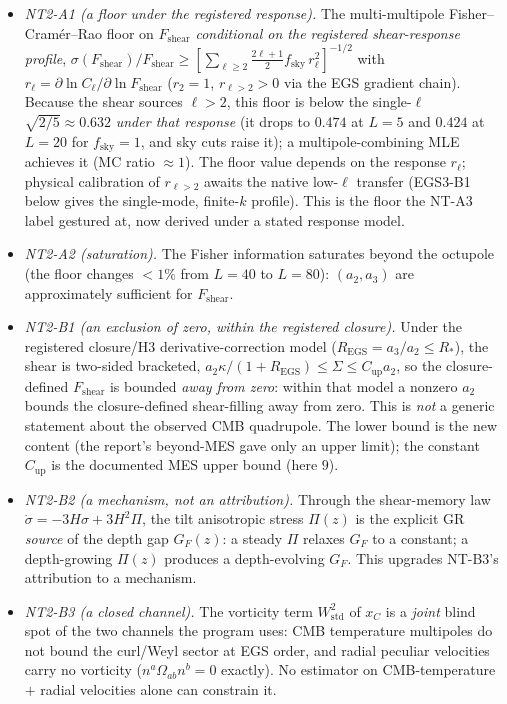 \documentclass[11pt,a4paper]{article}
\newcommand{\xC}{x_{C}}
\newcommand{\Wstd}{W^{2}_{\mathrm{std}}}
\newcommand{\Fshear}{F_{\mathrm{shear}}}
\newcommand{\GF}{G_{F}}
\theoremstyle{plain}
\theoremstyle{definition}
\begin{document}
\begin{itemize}[leftmargin=1.4em,itemsep=3pt]
  \item \emph{NT2-A1 (a floor under the registered response).} The
        multi-multipole Fisher--Cram\'er--Rao floor on $\Fshear$
        \emph{conditional on the registered shear-response profile},
        $\sigma(\Fshear)/\Fshear\ge[\sum_{\ell\ge2}\tfrac{2\ell+1}{2}f_{\mathrm{sky}}\,r_\ell^2]^{-1/2}$
        with $r_\ell=\partial\ln C_\ell/\partial\ln\Fshear$ ($r_2=1$,
        $r_{\ell>2}>0$ via the EGS gradient chain). Because the shear sources
        $\ell>2$, this floor is below the single-$\ell$
        $\sqrt{2/5}\approx0.632$ \emph{under that response} (it drops to $0.474$
        at $L=5$ and $0.424$ at $L=20$ for $f_{\mathrm{sky}}=1$, and sky cuts
        raise it); a multipole-combining MLE achieves it (MC ratio $\approx1$).
        The floor value depends on the response $r_\ell$; physical calibration of
        $r_{\ell>2}$ awaits the native low-$\ell$ transfer (EGS3-B1 below gives
        the single-mode, finite-$k$ profile). This is the floor the NT-A3 label
        gestured at, now derived under a stated response model.
  \item \emph{NT2-A2 (saturation).} The Fisher information saturates beyond the
        octupole (the floor changes $<1\%$ from $L{=}40$ to $L{=}80$): $(a_2,a_3)$
        are approximately sufficient for $\Fshear$.
  \item \emph{NT2-B1 (an exclusion of zero, within the registered closure).}
        Under the registered closure/H3 derivative-correction model
        ($R_{\mathrm{EGS}}=a_3/a_2\le R_*$), the shear is two-sided bracketed,
        $a_2\kappa/(1+R_{\mathrm{EGS}})\le\Sigma\le C_{\mathrm{up}}a_2$, so the
        closure-defined $\Fshear$ is bounded \emph{away from zero}: within that
        model a nonzero $a_2$ bounds the closure-defined shear-filling away from
        zero. This is \emph{not} a generic statement about the observed CMB
        quadrupole. The lower bound is the new content (the report's beyond-MES
        gave only an upper limit); the constant $C_{\mathrm{up}}$ is the
        documented MES upper bound (here $9$).
  \item \emph{NT2-B2 (a mechanism, not an attribution).} Through the
        shear-memory law $\dot\sigma=-3H\sigma+3H^2\Pi$, the tilt anisotropic
        stress $\Pi(z)$ is the explicit GR \emph{source} of the depth gap
        $\GF(z)$: a steady $\Pi$ relaxes $\GF$ to a constant; a depth-growing
        $\Pi(z)$ produces a depth-evolving $\GF$. This upgrades NT-B3's
        attribution to a mechanism.
  \item \emph{NT2-B3 (a closed channel).} The vorticity term $\Wstd$ of $\xC$ is
        a \emph{joint} blind spot of the two channels the program uses: CMB
        temperature multipoles do not bound the curl/Weyl sector at EGS order,
        and radial peculiar velocities carry no vorticity
        ($n^a\Omega_{ab}n^b=0$ exactly). No estimator on CMB-temperature $+$
        radial velocities alone can constrain it.
\end{itemize}
\end{document}
